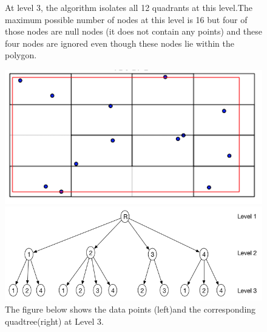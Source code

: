\documentclass{article}
\begin{document}
\begin{figure}[ht]


At level 3, the algorithm  isolates all 12 quadrants at this level.The maximum possible number of nodes at this level is 16 but four of  those nodes are null nodes (it does not contain any points) and these four nodes are ignored even though these nodes lie within the polygon.
\caption{The figure below shows the data points (left)and the corresponding quadtree(right) at Level 3.}
  \centering
  \begin{minipage}[b]{0.35\textwidth}
    \includegraphics[width=\textwidth]{4Quad1_3}  
  \end{minipage}
  \hfill
  \begin{minipage}[b]{0.6\textwidth}
    \includegraphics[width=\textwidth]{1_1Quad_3_tree}
  \end{minipage}
\end{figure}
\end{document}
